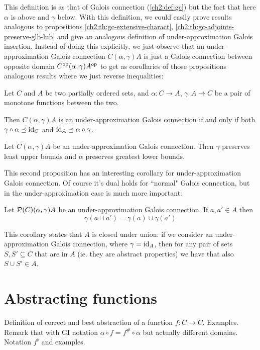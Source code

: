 This definition is as that of Galois connection (\ref{ch2:def:gc}) but the fact that here $\alpha$ is above and $\gamma$ below. With this definition, we could easily prove results analogous to propositions \ref{ch2:th:gc-extensive-charact}, \ref{ch2:th:gc-adjoints-preserve-glb-lub} and give an analogous definition of under-approximation Galois insertion.
Instead of doing this explicitly, we just observe that an under-approximation Galois connection $C (\alpha, \gamma) A$ is just a Galois connection between opposite domain $C^{\text{op}} (\alpha, \gamma) A^{\text{op}}$ to get as corollaries of those propositions analogous results where we just reverse inequalities:
\begin{prop}
	Let $C$ and $A$ be two partially ordered sets, and $\alpha : C \rightarrow A$, $\gamma : A \rightarrow C$ be a pair of monotone functions between the two.
	
	Then $C (\alpha, \gamma) A$ is an under-approximation Galois connection if and only if both $\gamma \circ \alpha \preceq \text{id}_C$ and $\text{id}_A \preceq \alpha \circ \gamma$.
\end{prop}

\begin{prop}
	Let $C (\alpha, \gamma) A$ be an under-approximation Galois connection. Then $\gamma$ preserves least upper bounds and $\alpha$ preserves greatest lower bounds.
\end{prop}

This second proposition has an interesting corollary for under-approximation Galois connection. Of course it's dual holds for ``normal" Galois connection, but in the under-approximation case is much more important:
\begin{corollary}\label{ch2:th:under-gc-union-closure}
	Let $\mathcal{P}(C) (\alpha, \gamma) A$ be an under-approximation Galois connection. If $a, a' \in A$ then
	\[
	\gamma(a \sqcup a') = \gamma(a) \cup \gamma(a')
	\]
\end{corollary}

This corollary states that $A$ is closed under union: if we consider an under-approximation Galois connection, where $\gamma = \text{id}_A$, then for any pair of sets $S, S' \subseteq C$ that are in $A$ (ie. they are abstract properties) we have that also $S \cup S' \in A$.

\section{Abstracting functions}
\todo{}
Definition of correct and best abstraction of a function $f: C \rightarrow C$. Examples.
Remark that with GI notation $\alpha \circ f = f^{\#} \circ \alpha$ but actually different domains.
Notation $f^{\flat}$ and examples.
